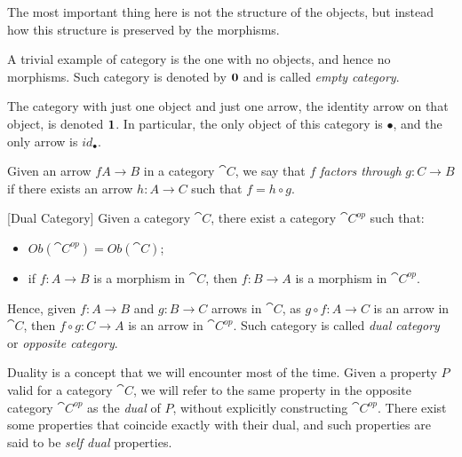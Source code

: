 The most important thing here is not the structure of the objects, but instead how this structure is preserved by the morphisms.

\begin{example}\label{ex:0_cat}
    A trivial example of category is the one with no objects, and hence no morphisms. Such category is denoted by $\textbf 0$ and is called \emph{empty category}.
\end{example}

\begin{example}\label{ex:1_cat}
    The category with just one object and just one arrow, the identity arrow on that object, is denoted $\textbf 1$. In particular, the only object of this category is $\bullet$, and the only arrow is $id_{\bullet}$.
\end{example}

Given an arrow $f A \rightarrow B$ in a category $\cat C$, we say that $f$ \emph{factors through} $g: C \rightarrow B$ if there exists an arrow $h: A \rightarrow C$ such that $f = h \circ g$.

\begin{definition}\label{def:dual_cat}[Dual Category]
    Given a category $\cat C$, there exist a category $\cat C^{op}$ such that:
    \begin{itemize}
        \item $Ob(\cat C^{op}) = Ob(\cat C)$;
        \item if $f: A \rightarrow B$ is a morphism in $\cat C$, then $f: B\rightarrow A$ is a morphism in $\cat C ^ {op}$.
    \end{itemize}
    Hence, given $f : A \rightarrow B$ and $g: B \rightarrow C$ arrows in $\cat C$, as $g \circ f: A \rightarrow C$ is an arrow in $\cat C$, then $f \circ g: C \rightarrow A$ is an arrow in $\cat C ^{op}$.
    Such category is called \emph{dual category} or \emph{opposite category}.
\end{definition}

Duality is a concept that we will encounter most of the time. Given a property $P$ valid for a category $\cat C$, we will refer to the same property in the opposite category $\cat C^{op}$ as the \emph{dual} of $P$, without explicitly constructing $\cat C^{op}$. There exist some properties that coincide exactly with their dual, and such properties are said to be \emph{self dual} properties.


